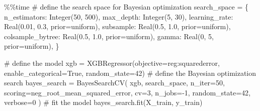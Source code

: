 \documentclass[
  letterpaper,
  DIV=11,
  numbers=noendperiod]{scrreprt}
\newenvironment{Shaded}{\begin{snugshade}}{\end{snugshade}}
\newcommand{\CommentTok}[1]{\textcolor[rgb]{0.37,0.37,0.37}{#1}}
\newcommand{\DecValTok}[1]{\textcolor[rgb]{0.68,0.00,0.00}{#1}}
\newcommand{\FloatTok}[1]{\textcolor[rgb]{0.68,0.00,0.00}{#1}}
\newcommand{\NormalTok}[1]{\textcolor[rgb]{0.00,0.23,0.31}{#1}}
\newcommand{\OperatorTok}[1]{\textcolor[rgb]{0.37,0.37,0.37}{#1}}
\newcommand{\StringTok}[1]{\textcolor[rgb]{0.13,0.47,0.30}{#1}}
\newcommand{\VariableTok}[1]{\textcolor[rgb]{0.07,0.07,0.07}{#1}}
\begin{document}
\begin{Shaded}
\begin{Highlighting}[]
\OperatorTok{\%\%}\NormalTok{time}
\CommentTok{\# define the search space for Bayesian optimization}
\NormalTok{search\_space }\OperatorTok{=}\NormalTok{ \{}
    \StringTok{\textquotesingle{}n\_estimators\textquotesingle{}}\NormalTok{: Integer(}\DecValTok{50}\NormalTok{, }\DecValTok{500}\NormalTok{),}
    \StringTok{\textquotesingle{}max\_depth\textquotesingle{}}\NormalTok{: Integer(}\DecValTok{5}\NormalTok{, }\DecValTok{30}\NormalTok{),}
    \StringTok{\textquotesingle{}learning\_rate\textquotesingle{}}\NormalTok{: Real(}\FloatTok{0.01}\NormalTok{, }\FloatTok{0.3}\NormalTok{, prior}\OperatorTok{=}\StringTok{\textquotesingle{}uniform\textquotesingle{}}\NormalTok{),}
    \StringTok{\textquotesingle{}subsample\textquotesingle{}}\NormalTok{: Real(}\FloatTok{0.5}\NormalTok{, }\FloatTok{1.0}\NormalTok{, prior}\OperatorTok{=}\StringTok{\textquotesingle{}uniform\textquotesingle{}}\NormalTok{),}
    \StringTok{\textquotesingle{}colsample\_bytree\textquotesingle{}}\NormalTok{: Real(}\FloatTok{0.5}\NormalTok{, }\FloatTok{1.0}\NormalTok{, prior}\OperatorTok{=}\StringTok{\textquotesingle{}uniform\textquotesingle{}}\NormalTok{),}
    \StringTok{\textquotesingle{}gamma\textquotesingle{}}\NormalTok{: Real(}\DecValTok{0}\NormalTok{, }\DecValTok{5}\NormalTok{, prior}\OperatorTok{=}\StringTok{\textquotesingle{}uniform\textquotesingle{}}\NormalTok{),}
\NormalTok{\}}

\CommentTok{\# define the model}
\NormalTok{xgb }\OperatorTok{=}\NormalTok{ XGBRegressor(objective}\OperatorTok{=}\StringTok{\textquotesingle{}reg:squarederror\textquotesingle{}}\NormalTok{, enable\_categorical}\OperatorTok{=}\VariableTok{True}\NormalTok{, random\_state}\OperatorTok{=}\DecValTok{42}\NormalTok{)}
\CommentTok{\# define the Bayesian optimization search}
\NormalTok{bayes\_search }\OperatorTok{=}\NormalTok{ BayesSearchCV(}
\NormalTok{    xgb,}
\NormalTok{    search\_space,}
\NormalTok{    n\_iter}\OperatorTok{=}\DecValTok{50}\NormalTok{,}
\NormalTok{    scoring}\OperatorTok{=}\StringTok{\textquotesingle{}neg\_root\_mean\_squared\_error\textquotesingle{}}\NormalTok{,}
\NormalTok{    cv}\OperatorTok{=}\DecValTok{3}\NormalTok{,}
\NormalTok{    n\_jobs}\OperatorTok{={-}}\DecValTok{1}\NormalTok{,}
\NormalTok{    random\_state}\OperatorTok{=}\DecValTok{42}\NormalTok{,}
\NormalTok{    verbose}\OperatorTok{=}\DecValTok{0}
\NormalTok{)}
\CommentTok{\# fit the model}
\NormalTok{bayes\_search.fit(X\_train, y\_train)}
\end{Highlighting}
\end{Shaded}
\end{document}
